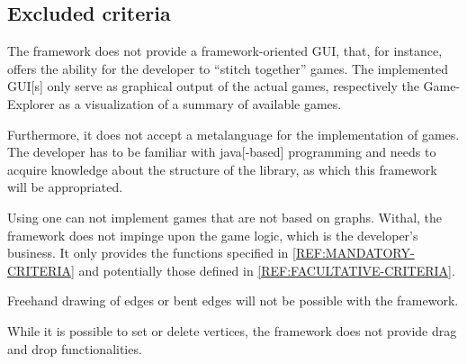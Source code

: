 \subsection{Excluded criteria}
The {\graphioli} framework does not provide a framework-oriented \gls{GUI}, that, for instance, offers the ability for the developer to ``stitch together'' games. The implemented \gls{GUI}[s] only serve as graphical output of the actual games, respectively the Game-Explorer as a visualization of a summary of available games.\par
Furthermore, it does not accept a \gls{metalanguage} for the implementation of games. The \gls{developer} has to be familiar with \Gls{java}[-based] programming and needs to acquire knowledge about the structure of the \gls{library}, as which this framework will be appropriated.\par
Using {\graphioli} one can not implement \glspl{game} that are not based on \glspl{graph}. Withal, the framework does not impinge upon the game logic, which is the developer's business. It only provides the functions specified in \ref{REF:MANDATORY-CRITERIA} and potentially those defined in \ref{REF:FACULTATIVE-CRITERIA}.\par
Freehand drawing of \glspl{edge} or bent edges will not be possible with the {\graphioli} framework.\par
While it is possible to set or delete vertices, the framework does not provide drag and drop functionalities.\par